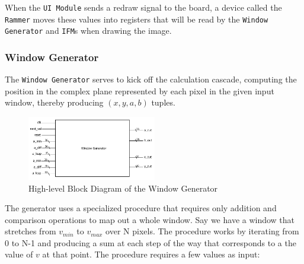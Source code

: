 \documentclass{article}
\begin{document}
When the \texttt{UI Module} sends a redraw signal to the board, a device called the \texttt{Rammer} moves
these values into registers that will be read by the \texttt{Window Generator} and \texttt{IFM}s when drawing
the image.

\subsubsection{Window Generator}

The \texttt{Window Generator} serves to kick off the calculation cascade,
computing the position in the complex plane represented by each pixel in the
given input window, thereby producing 
$(x, y, a, b)$ tuples. 

\begin{figure}
  \centering
    \includegraphics[width=160pt]{block_diagrams/win_gen.pdf}
  \caption{High-level Block Diagram of the Window Generator}
\end{figure}


The generator uses a specialized procedure that requires only addition and comparison
operations to map out a whole window. Say we have a window that stretches from $v_{min}$ to $v_{max}$ over
N pixels. The procedure works by iterating from 0 to N-1 and producing a sum at each step of the way that
corresponds to a the value of $v$ at that point. The procedure requires a few values as input:
\end{document}
